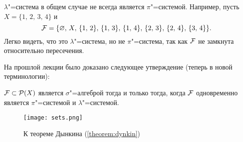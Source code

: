 \begin{exercise}
    $\lambda$"=система в общем случае не всегда является $\pi$"=системой. Например, пусть 
    $X=\{1,\,2,\,3,\,4\}$ и 
    \[
        \mathcal{F}  = \{\varnothing,\, X,\, \{1,\,2\},\, \{1,\,3\},\,\{1,\,4\},\,\{2,\,3\},\,\{2,\,4\},\,\{3,\,4\}\}.    
    \]
    Легко видеть, что это $\lambda$"=система, но не $\pi$"=система, так как $\mathcal{F} $ не замкнута относительно пересечения.
\end{exercise}

На прошлой лекции было доказано следующее утверждение (теперь в новой терминологии):
\begin{claim}
    $\mathcal{F} \subset\mathcal{P}(X)$ является $\sigma$"=алгеброй тогда и только тогда, когда $\mathcal{F} $ 
    одновременно является $\pi$"=системой и $\lambda$"=системой.
\end{claim}

\begin{figure}[!ht]
    \centering
    \texttt{[image: sets.png]}
    \caption{К теореме Дынкина (\ref{theorem:dynkin})}
    \label{fig:sets}
\end{figure}


